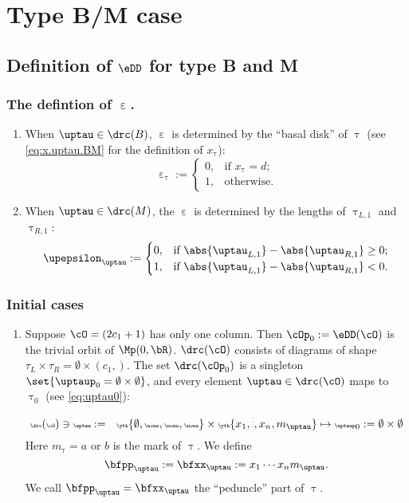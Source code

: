 \documentclass[ssunip]{subfiles}
\begin{document}
\section{Type B/M case}

\subsection{Definition of $\eDD$ for type B and M}
\def\taulf{\uptau_{L,1}}
\def\taurf{\uptau_{R,1}}
\subsubsection{The defintion of $\upepsilon$.} \label{sec:upepsilon.BM}
\begin{enumerate}[label=(\arabic*).,series=alg2]
  \item When $\uptau\in \drc(B)$, $\upepsilon$ is determined by the ``basal
  disk'' of $\uptau$ (see \eqref{eq:x.uptau.BM} for the definition of $x_{\uptau}$):
  \[
    \upepsilon_{\uptau}:=
    \begin{cases}
      0, & \text{if $x_{\uptau}=d$;} \\
      1, & \text{otherwise.}
    \end{cases}
  \]
  \item When $\uptau\in \drc(M)$, the  $\upepsilon$  is determined by
  the lengths of $\taulf$ and $\taurf$:
  \[
    \upepsilon_{\uptau} :=
    \begin{cases}
      0, & \text{if }\abs{\taulf} - \abs{\taurf} \geq  0;\\
      1, & \text{if }\abs{\taulf} - \abs{\taurf}<0.
    \end{cases}
  \]
\end{enumerate}


\subsubsection{Initial cases}

\begin{enumerate}[resume*=alg2]
  \item Suppose $\cO = (2c_{1}+1)$ has only one column. Then
        $\cOp_{0}:=\eDD(\cO)$ is the trivial orbit of $\Mp(0,\bR)$. $\drc(\cO)$
        consists of diagrams of shape
        $\tau_{L}\times \tau_{R} =\emptyset\times (c_{1},)$.
        The set $\drc(\cOp_{0})$ is a singleton $\set{\uptaup_{0}=\emptyset\times \emptyset}$, and every element
        $\uptau \in \drc(\cO)$ maps to $\uptau_{0}$ (see \eqref{eq:uptau0}):
        \[\tiny
          \drc(\cO)\ni \uptau:= \hspace{1em} \ytb{\emptyset,\none,\none,\none}
          \times \ytb{{x_{1}},\vdots,{x_{n}},{m_{\uptau}}}
          \mapsto \uptaup_{0}:=\emptyset\times \emptyset
        \]
        Here $m_{\uptau}=a$ or $b$ is the mark of $\uptau$.
        We define
        \[
          \bfpp_{\uptau}:=\bfxx_{\uptau} := x_{1}\cdots x_{n} m_{\uptau}.%
        \]
        We call $\bfpp_{\uptau}=\bfxx_{\uptau}$ the ``peduncle'' part of
        $\uptau$.
\end{enumerate}
\end{document}
